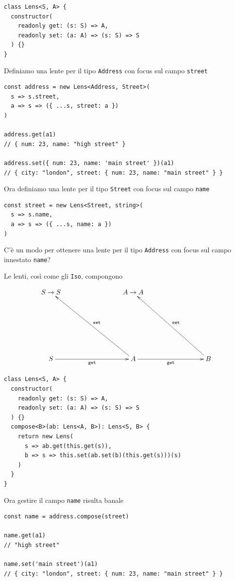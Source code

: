 \documentclass[12pt]{article}
\begin{document}
\begin{verbatim}
class Lens<S, A> {
  constructor(
    readonly get: (s: S) => A,
    readonly set: (a: A) => (s: S) => S
  ) {}
}
\end{verbatim}

Definiamo una lente per il tipo \texttt{Address} con focus sul campo \texttt{street}

\begin{verbatim}
const address = new Lens<Address, Street>(
  s => s.street,
  a => s => ({ ...s, street: a })
)

address.get(a1)
// { num: 23, name: "high street" }

address.set({ num: 23, name: 'main street' })(a1)
// { city: "london", street: { num: 23, name: "main street" } }
\end{verbatim}

Ora definiamo una lente per il tipo \texttt{Street} con focus sul campo \texttt{name}

\begin{verbatim}
const street = new Lens<Street, string>(
  s => s.name,
  a => s => ({ ...s, name: a })
)
\end{verbatim}

C'è un modo per ottenere una lente per il tipo \texttt{Address} con focus sul campo innestato \texttt{name}?

Le lenti, così come gli \texttt{Iso}, compongono

\[
\xymatrixrowsep{3cm}
\xymatrixcolsep{3cm}
\xymatrix{
  {S \rightarrow S} & {A \rightarrow A} \\
  S \ar[r]_{\texttt{get}} & A \ar[lu]_{\texttt{set}} \ar[r]_{\texttt{get}} & B \ar[lu]_{\texttt{set}}
}
\]

\begin{verbatim}
class Lens<S, A> {
  constructor(
    readonly get: (s: S) => A,
    readonly set: (a: A) => (s: S) => S
  ) {}
  compose<B>(ab: Lens<A, B>): Lens<S, B> {
    return new Lens(
      s => ab.get(this.get(s)),
      b => s => this.set(ab.set(b)(this.get(s)))(s)
    )
  }
}
\end{verbatim}

Ora gestire il campo \texttt{name} risulta banale

\begin{verbatim}
const name = address.compose(street)

name.get(a1)
// "high street"

name.set('main street')(a1)
// { city: "london", street: { num: 23, name: "main street" } }
\end{verbatim}
\end{document}
